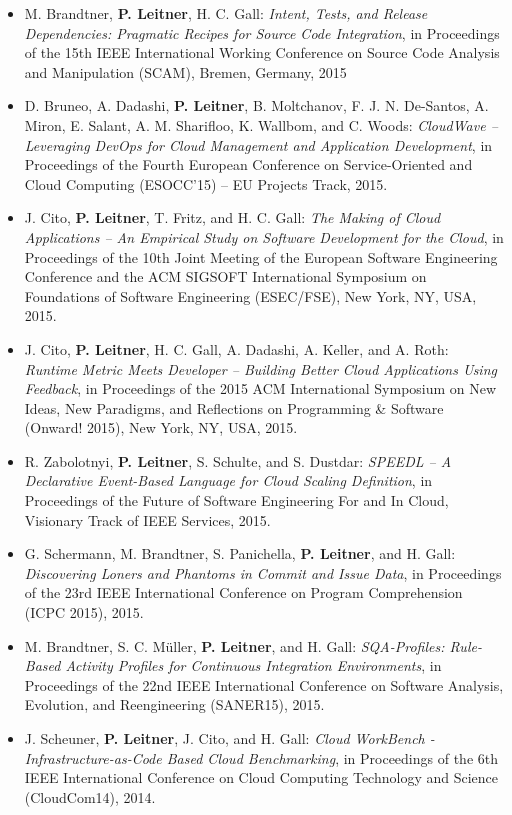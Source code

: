 \documentclass[paper=letter,fontsize=11pt]{scrartcl} %
\begin{document}
\begin{itemize}
  \item M. Brandtner, \textbf{P. Leitner}, H. C. Gall: \emph{Intent, Tests, and Release Dependencies: Pragmatic Recipes for Source Code Integration}, in Proceedings of the 15th IEEE International Working Conference on Source Code Analysis and Manipulation (SCAM), Bremen, Germany, 2015
  \item  D. Bruneo, A. Dadashi, \textbf{P. Leitner}, B. Moltchanov, F. J. N. De-Santos, A. Miron, E. Salant, A. M. Sharifloo, K. Wallbom, and C. Woods: \emph{CloudWave – Leveraging DevOps for Cloud Management and Application Development}, in Proceedings of the Fourth European Conference on Service-Oriented and Cloud Computing (ESOCC’15) – EU Projects Track, 2015.
      \item J. Cito, \textbf{P. Leitner}, T. Fritz, and H. C. Gall: \emph{The Making of Cloud Applications -- An Empirical Study on Software Development for the Cloud}, in Proceedings of the 10th Joint Meeting of the European Software Engineering Conference and the ACM SIGSOFT International Symposium on Foundations of Software Engineering (ESEC/FSE), New York, NY, USA, 2015.
      \item J. Cito, \textbf{P. Leitner}, H. C. Gall, A. Dadashi, A. Keller, and A. Roth: \emph{Runtime Metric Meets Developer -- Building Better Cloud Applications Using Feedback}, in Proceedings of the 2015 ACM International Symposium on New Ideas, New Paradigms, and Reflections on Programming \& Software (Onward! 2015), New York, NY, USA, 2015.
      \item R. Zabolotnyi, \textbf{P. Leitner}, S. Schulte, and S. Dustdar: \emph{SPEEDL -- A Declarative Event-Based Language for Cloud Scaling Definition}, in Proceedings of the Future of Software Engineering For and In Cloud, Visionary Track of IEEE Services, 2015.
  \item G. Schermann, M. Brandtner, S. Panichella, \textbf{P. Leitner}, and H. Gall: \emph{Discovering Loners and Phantoms in Commit and Issue Data}, in Proceedings of the 23rd IEEE International Conference
on Program Comprehension (ICPC 2015), 2015.
  \item M. Brandtner, S. C. M\"uller, \textbf{P. Leitner}, and H. Gall: \emph{SQA-Profiles: Rule-Based Activity Profiles for Continuous Integration Environments}, in Proceedings of the 22nd IEEE International Conference on Software Analysis, Evolution, and Reengineering (SANER15), 2015.
  \item J. Scheuner, \textbf{P. Leitner}, J. Cito, and H. Gall: \emph{Cloud WorkBench - Infrastructure-as-Code Based Cloud Benchmarking}, in Proceedings of the 6th IEEE International Conference on Cloud Computing Technology and Science (CloudCom14), 2014.

\end{itemize}
\end{document}
